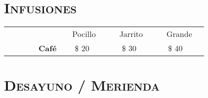 

\section{\textsc{\textbf{Infusiones}}}

\begin{table}
 \begin{tabular}{l c c c }
 ~ & $ \> \> \> $ Pocillo $\> \> \> $ & $\> \> \> $ Jarrito $\> \> \> $ & $\> \> \> $ Grande $\> \> \> $ \\ %
 $\> \> \> \>  \> \> \> \> \> \> \> \> \> \> \> \>  $ \textbf{Café} & $\> \> \> $ \$ 20    & $\> \> \> $ \$ 30    & \$ 40   \\
 \end{tabular}
\end{table}


\section{\textsc{\textbf{Desayuno / Merienda}}}


